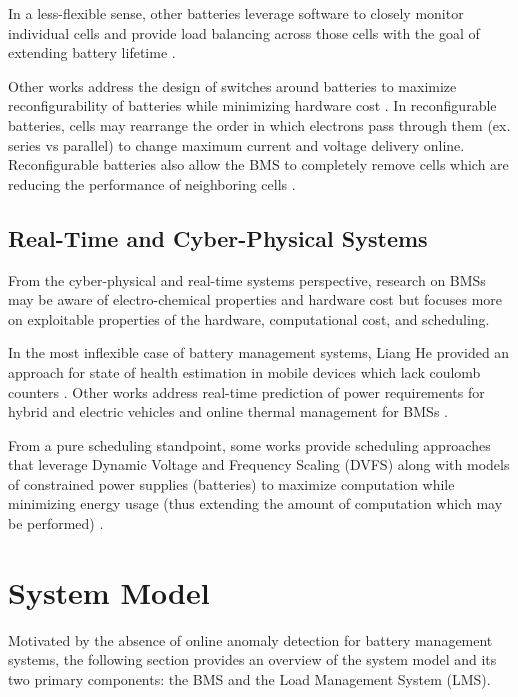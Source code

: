 \documentclass[11pt,conference,draftcls,onecolumn]{IEEEtran}
\begin{document}
In a less-flexible sense, other batteries leverage software to closely monitor individual cells and provide load balancing across those cells with the goal of extending battery lifetime \cite{towardsSmarterBatteryDesign}.

Other works address the design of switches around batteries to maximize reconfigurability of batteries while minimizing hardware cost \cite{reconfigurableBatteryTechniquesAndSystems}.
In reconfigurable batteries, cells may rearrange the order in which electrons pass through them (ex. series vs parallel) to change maximum current and voltage delivery online.
Reconfigurable batteries also allow the BMS to completely remove cells which are reducing the performance of neighboring cells \cite{aCaseStudyOnImprovingCapacityDeliveryOfBatteryPacksViaReconfiguration}.

\subsection{Real-Time and Cyber-Physical Systems}
From the cyber-physical and real-time systems perspective, research on BMSs may be aware of electro-chemical properties and hardware cost but focuses more on exploitable properties of the hardware, computational cost, and scheduling.

In the most inflexible case of battery management systems, Liang He provided an approach for state of health estimation in mobile devices which lack coulomb counters \cite{batterySoHEstimationMobile}.
Other works address real-time prediction of power requirements for hybrid and electric vehicles \cite{realTimePredictionOfBatteryPowerRequirements} and online thermal management for BMSs \cite{realTimeBatteryThermalManagement}.

From a pure scheduling standpoint, some works provide scheduling approaches that leverage Dynamic Voltage and Frequency Scaling (DVFS) along with models of constrained power supplies (batteries) to maximize computation while minimizing energy usage (thus extending the amount of computation which may be performed) \cite{batteryAwareDynamicSchedulingForPeriodicTaskGraphs}.

\section{System Model}\label{sec:systemModel}

Motivated by the absence of online anomaly detection for battery management systems, the following section provides an overview of the system model and its two primary components: the BMS and the Load Management System (LMS).
\end{document}
